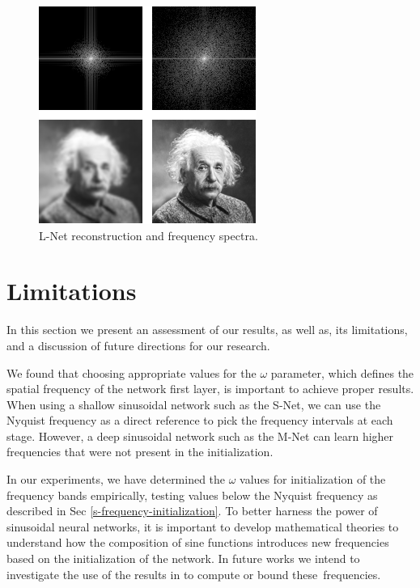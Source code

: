 \begin{figure}[!h]
\centering
\includegraphics[width=0.98\linewidth]{img/ch5/albert-lnet.png}
\caption{L-Net reconstruction and frequency spectra.}
\label{f:albert-lnet}
\end{figure}





\section{Limitations}

In this section we present an assessment of our results, as well as, its limitations, and a discussion of future directions for our research.

We found that choosing appropriate values for the $\omega$ parameter, which defines the spatial frequency of the network first layer, is important to achieve proper results. 
When using a shallow sinusoidal network such as the S-Net, we can use the Nyquist frequency as a direct reference to pick the frequency intervals at each stage. However, a deep sinusoidal network such as the M-Net can learn higher frequencies that were not present in the initialization. 

In our experiments, we have determined the $\omega$ values for initialization of the frequency bands empirically, testing values below the Nyquist frequency as described in Sec \ref{s-frequency-initialization}. To better harness the power of sinusoidal neural networks, it is important to develop mathematical theories to understand how the composition of sine functions introduces new frequencies based on the initialization of the network. In future works we intend to investigate the use of the results in \cite{novello2022understanding} to compute or bound these~frequencies.